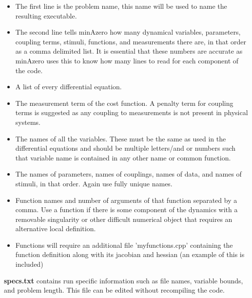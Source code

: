 \documentclass[11pt]{article}
\begin{document}
\begin{itemize}
\item The first line is the problem name, this name will be used to name the resulting executable.
\item The second line tells minAzero how many dynamical variables, parameters, coupling terms, stimuli, functions, and measurements there are, in that order as a comma delimited list.  It is essential that these numbers are accurate as minAzero uses this to know how many lines to read for each component of the code.

\item A list of every differential equation.

\item The measurement term of the cost function.  A penalty term for coupling terms is suggested as any coupling to measurements is not present in physical systems.

\item The names of all the variables.  These must be the same as used in the differential equations and should be multiple letters/and or numbers such that variable name is contained in any other name or common function.
\item The names of parameters, names of couplings, names of data, and names of stimuli, in that order.  Again use fully unique names.
\item Function names and number of arguments of that function separated by a comma.  Use a function if there is some component of the dynamics with a removable singularity or other difficult numerical object that requires an alternative local definition.
\item Functions will require an additional file 'myfunctions.cpp' containing the function definition along with its jacobian and hessian (an example of this is included)
\end{itemize}
\bigskip
\pagebreak
{\bf specs.txt} contains run specific information such as file names, variable bounds, and problem length.  This file can be edited without recompiling the code.
\end{document}
